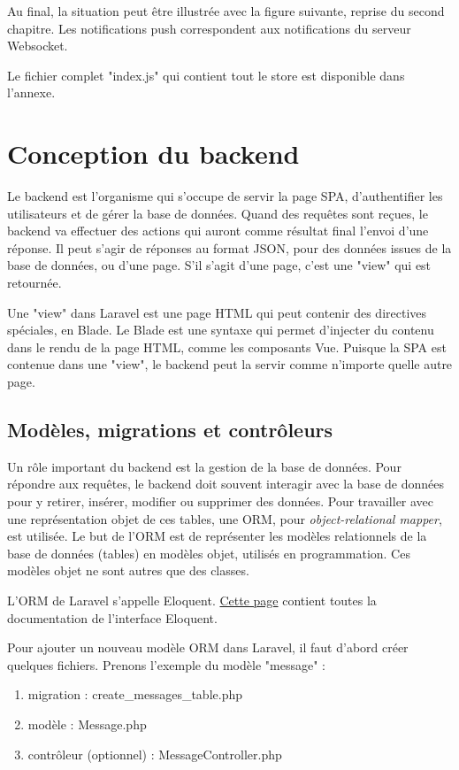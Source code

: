 \documentclass[
    iai, %
    eai, %
]{heig-tb}
\begin{document}
Au final, la situation peut être illustrée avec la figure suivante, reprise du second chapitre.
Les notifications push correspondent aux notifications du serveur Websocket.

Le fichier complet "index.js" qui contient tout le store est disponible dans l'annexe.

\newpage
\chapter{Conception du backend}
Le backend est l'organisme qui s'occupe de servir la page SPA, d'authentifier les utilisateurs et de gérer la base de données.
Quand des requêtes sont reçues, le backend va effectuer des actions qui auront comme résultat final l'envoi d'une réponse. Il peut s'agir de réponses au format JSON, pour des données issues de la base de données, ou d'une page. S'il s'agit d'une page, c'est une "view" qui est retournée.

Une "view" dans Laravel est une page HTML qui peut contenir des directives spéciales, en Blade. Le Blade est une syntaxe qui permet d'injecter du contenu dans le rendu de la page HTML, comme les composants Vue. Puisque la SPA est contenue dans une "view", le backend peut la servir comme n'importe quelle autre page.

\section{Modèles, migrations et contrôleurs}
Un rôle important du backend est la gestion de la base de données. Pour répondre aux requêtes, le backend doit souvent interagir avec la base de données pour y retirer, insérer, modifier ou supprimer des données. Pour travailler avec une représentation objet de ces tables, une ORM, pour \emph{object-relational mapper}, est utilisée. Le but de l'ORM est de représenter les modèles relationnels de la base de données (tables) en modèles objet, utilisés en programmation. Ces modèles objet ne sont autres que des classes.

L'ORM de Laravel s'appelle Eloquent. \href{https://laravel.com/docs/8.x/eloquent}{Cette page} contient toutes la documentation de l'interface Eloquent.

Pour ajouter un nouveau modèle ORM dans Laravel, il faut d'abord créer quelques fichiers. Prenons l'exemple du modèle "message" :
\begin{enumerate}
  \item migration : create\_messages\_table.php
  \item modèle : Message.php
  \item contrôleur (optionnel) : MessageController.php
\end{enumerate}
\bigskip
\end{document}
